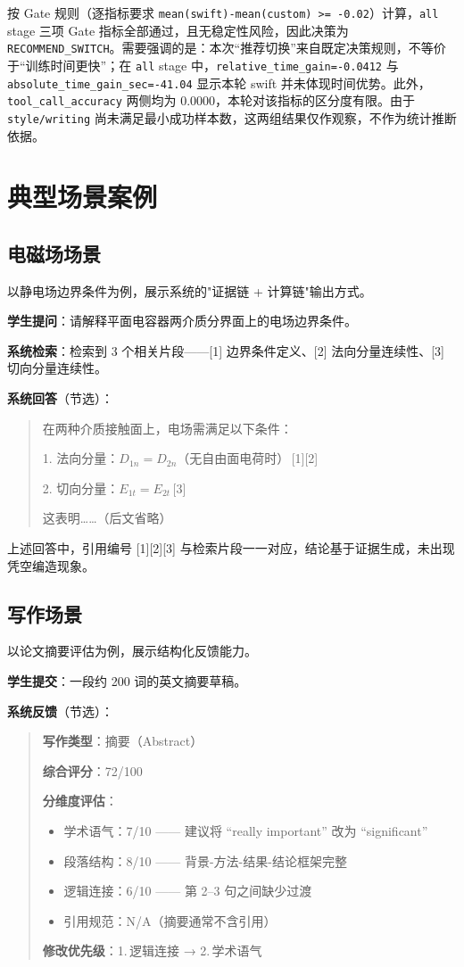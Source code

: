 按 Gate 规则（逐指标要求 \texttt{mean(swift)-mean(custom) >= -0.02}）计算，\texttt{all} stage 三项 Gate 指标全部通过，且无稳定性风险，因此决策为 \texttt{RECOMMEND\_SWITCH}。需要强调的是：本次“推荐切换”来自既定决策规则，不等价于“训练时间更快”；在 \texttt{all} stage 中，\texttt{relative\_time\_gain=-0.0412} 与 \texttt{absolute\_time\_gain\_sec=-41.04} 显示本轮 swift 并未体现时间优势。此外，\texttt{tool\_call\_accuracy} 两侧均为 0.0000，本轮对该指标的区分度有限。由于 \texttt{style/writing} 尚未满足最小成功样本数，这两组结果仅作观察，不作为统计推断依据。

\section{典型场景案例}

\subsection{电磁场场景}
以静电场边界条件为例，展示系统的"证据链 + 计算链"输出方式。

\textbf{学生提问}：请解释平面电容器两介质分界面上的电场边界条件。

\textbf{系统检索}：检索到 3 个相关片段——[1] 边界条件定义、[2] 法向分量连续性、[3] 切向分量连续性。

\textbf{系统回答}（节选）：
\begin{quote}
在两种介质接触面上，电场需满足以下条件：

1. 法向分量：$D_{1n} = D_{2n}$（无自由面电荷时）\,[1][2]

2. 切向分量：$E_{1t} = E_{2t}$\,[3]

这表明……（后文省略）
\end{quote}

上述回答中，引用编号 [1][2][3] 与检索片段一一对应，结论基于证据生成，未出现凭空编造现象。

\subsection{写作场景}
以论文摘要评估为例，展示结构化反馈能力。

\textbf{学生提交}：一段约 200 词的英文摘要草稿。

\textbf{系统反馈}（节选）：
\begin{quote}
\textbf{写作类型}：摘要（Abstract）

\textbf{综合评分}：72/100

\textbf{分维度评估}：
\begin{itemize}
  \item 学术语气：7/10 —— 建议将 ``really important'' 改为 ``significant''
  \item 段落结构：8/10 —— 背景-方法-结果-结论框架完整
  \item 逻辑连接：6/10 —— 第 2--3 句之间缺少过渡
  \item 引用规范：N/A（摘要通常不含引用）
\end{itemize}

\textbf{修改优先级}：1.\,逻辑连接 → 2.\,学术语气
\end{quote}

